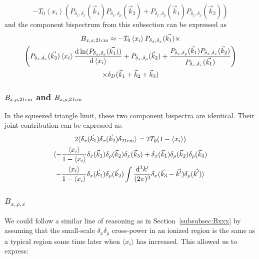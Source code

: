 \begin{equation}
-T_0 \left\langle x_i \right\rangle \left(P_{\delta_x, \delta_x}(\vec{k}_1) P_{\delta_x, \delta_{\rho}}(\vec{k}_2)  + P_{\delta_x, \delta_{\rho}}(\vec{k}_1) P_{\delta_x, \delta_x}(\vec{k}_2)  \right)
\end{equation}
and the component bispectrum from this subsection can be expressed as
\begin{multline}
B_{x,x,{\rm 21cm}} \approx 
 - T_0 \left\langle x_i \right\rangle P_{\delta_x,\delta_x}(\vec{k_1}) \times \\
\left(
P_{\delta_x,\delta_x}(\vec{k_3}) \left\langle x_i \right\rangle \frac{{\rm d} \ln (P_{\delta_x,\delta_x}(\vec{k_1}))}{{\rm d}\left\langle x_i \right\rangle} 
+ P_{\delta_x, \delta_{\rho}}(\vec{k}_2)  +\frac{ P_{\delta_x, \delta_{\rho}}(\vec{k}_1)P_{\delta_x, \delta_x}(\vec{k}_2)}{P_{\delta_x,\delta_x}(\vec{k_1}) } 
\right) \\
\times \delta_D(\vec{k}_1+\vec{k}_2+\vec{k}_3)
\end{multline}

\subsubsection{$B_{x,\rho,{\rm 21cm}}$ and $B_{x,\rho,{\rm 21cm}}$}
\label{subsec:B_xrho21}

In the squeezed triangle limit, these two component bispectra are identical. Their joint contribution can be expressed as:
\begin{multline}
2\langle \delta_x(\vec{k}_1) \delta_x(\vec{k}_2) \delta_{{\rm 21cm}}\rangle = 
2T_0(1-\left\langle x_i \right\rangle) \\ \langle 
- \frac{\left\langle x_i \right\rangle}{1-\left\langle x_i \right\rangle} \delta_x(\vec{k}_1) \delta_{\rho}(\vec{k}_2) \delta_x(\vec{k}_3) 
+ \delta_x(\vec{k}_1) \delta_{\rho}(\vec{k}_2) \delta_{\rho}(\vec{k}_3) \\
- \frac{\left\langle x_i \right\rangle}{1-\left\langle x_i \right\rangle} \delta_x(\vec{k}_1) \delta_{\rho}(\vec{k}_2) \int \frac{{\rm d^3}k'}{(2\pi)^3} \delta_x(\vec{k}_3 - \vec{k'})\delta_{\rho}(\vec{k'})\rangle
\end{multline}

\subsubsection*{$B_{x,\rho,x}$}
\label{subsubsec:Bxrhox}
We could follow a similar line of reasoning as in Section~\ref{subsubsec:Bxxx} by assuming that the small-scale $\delta_x\delta_{\rho}$ cross-power in an ionized region is the same as a typical region some time later when $\langle x_i \rangle$ has increased. This allowed us to express:

